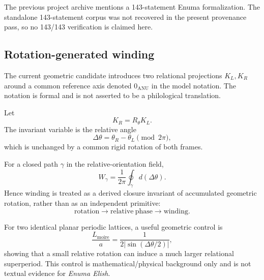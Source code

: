 The previous project archive mentions a 143-statement Enuma formalization.
The standalone 143-statement corpus was not recovered in the present
provenance pass, so no 143/143 verification is claimed here.


\subsection{Rotation-generated winding}

The current geometric candidate introduces two relational projections
$K_L,K_R$ around a common reference axis denoted $0_{\mathrm{ANU}}$ in the
model notation.  The notation is formal and is not asserted to be a
philological translation.

Let
\[
K_R=R_{\theta}K_L.
\]
The invariant variable is the relative angle
\[
\Delta\theta
=
\theta_R-\theta_L
\pmod{2\pi},
\]
which is unchanged by a common rigid rotation of both frames.

For a closed path $\gamma$ in the relative-orientation field,
\[
\boxed{
W_\gamma
=
\frac{1}{2\pi}
\oint_\gamma d(\Delta\theta)
}.
\]
Hence winding is treated as a derived closure invariant of accumulated
geometric rotation, rather than as an independent primitive:
\[
\boxed{
\mathrm{rotation}
\longrightarrow
\mathrm{relative\ phase}
\longrightarrow
\mathrm{winding}.
}
\]

For two identical planar periodic lattices, a useful geometric control is
\[
\frac{L_{\mathrm{moire}}}{a}
=
\frac{1}
{2\left|\sin(\Delta\theta/2)\right|},
\]
showing that a small relative rotation can induce a much larger relational
superperiod.  This control is mathematical/physical background only and is
not textual evidence for \emph{Enuma Elish}.
